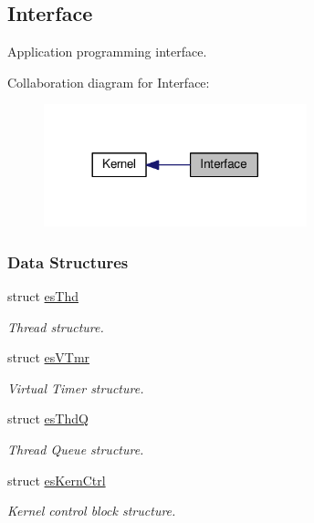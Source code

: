 \hypertarget{group__kern__intf}{\subsection{Interface}
\label{group__kern__intf}
}


Application programming interface.  


Collaboration diagram for Interface\-:\nopagebreak
\begin{figure}[H]
\begin{center}
\leavevmode
\includegraphics[width=216pt]{group__kern__intf}
\end{center}
\end{figure}
\subsubsection*{Data Structures}
\begin{DoxyCompactItemize}
\item 
struct \hyperlink{structesThd}{es\-Thd}
\begin{DoxyCompactList}\small\item\em Thread structure. \end{DoxyCompactList}\item 
struct \hyperlink{structesVTmr}{es\-V\-Tmr}
\begin{DoxyCompactList}\small\item\em Virtual Timer structure. \end{DoxyCompactList}\item 
struct \hyperlink{structesThdQ}{es\-Thd\-Q}
\begin{DoxyCompactList}\small\item\em Thread Queue structure. \end{DoxyCompactList}\item 
struct \hyperlink{structesKernCtrl}{es\-Kern\-Ctrl}
\begin{DoxyCompactList}\small\item\em Kernel control block structure. \end{DoxyCompactList}\end{DoxyCompactItemize}
